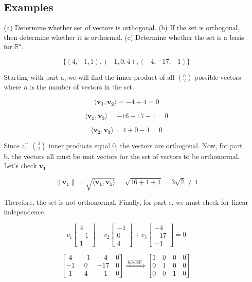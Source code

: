 \documentclass{report}
\begin{document}
\subsection{Examples}

\begin{tcolorbox}[colframe = lightred]
	(a) Determine whether set of vectors is orthogonal. (b) If the set is orthogonal, then determine whether it is orthormal. (c) Determine whether the set is a basis for $\mathbb{R}^n$.
	
	$$
	\{ (4,-1,1), (-1,0,4), (-4,-17,-1) \}
	$$
\end{tcolorbox}

Starting with part a, we will find the inner product of all $n \choose 2$ possible vectors where $n$ is the number of vectors in the set.

$$
\langle \bm{v_1}, \bm{v_2} \rangle = -4 + 4 = 0
$$

$$
\langle \bm{v_1}, \bm{v_3} \rangle = -16 + 17 - 1 = 0
$$

$$
\langle \bm{v_2}, \bm{v_3} \rangle = 4 + 0 - 4 = 0
$$

Since all $3 \choose 2$ inner products equal $0$, the vectors are orthogonal. Now, for part b, the vectors all must be unit vectors for the set of vectors to be orthonormal. Let's check $\bm{v_1}$

$$
\| \bm{v_1} \| = \sqrt{\langle \bm{v_1}, \bm{v_1} \rangle} = \sqrt{16 + 1 + 1} = 3\sqrt{2}\ne 1 
$$

Therefore, the set is not orthonormal. Finally, for part c, we must check for linear independence.

$$
c_1 \begin{bmatrix} 4 \\ -1 \\ 1 \end{bmatrix} + c_2 \begin{bmatrix} -1 \\ 0 \\ 4 \end{bmatrix} + c_3 \begin{bmatrix} -4 \\ -17 \\ -1 \end{bmatrix} = 0
$$

$$
\begin{bmatrix} 4 & -1 & -4 & 0 \\ -1 & 0 & -17 & 0 \\ 1 & 4 & -1 & 0 \end{bmatrix} \xRightarrow{\text{RREF}} \begin{bmatrix} 1 & 0 & 0 & 0 \\ 0 & 1 & 0 & 0 \\ 0 & 0 & 1 & 0  \end{bmatrix}
$$
\end{document}
